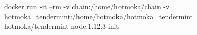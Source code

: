 \begin{shellcommandbox}\begin{ttlst}
docker run -it --rm -v chain:/home/hotmoka/chain -v hotmoka_tendermint:/home/hotmoka/hotmoka_tendermint hotmoka/tendermint-node:1.12.3 init
\end{ttlst}\end{shellcommandbox}
